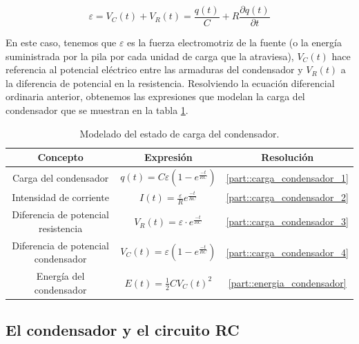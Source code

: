 \documentclass[../main.tex]{subfiles}
\begin{document}
\begin{equation}
    \varepsilon = V_C(t) + V_R(t) = \frac{q(t)}{C} + R\frac{\partial q(t)}{\partial t}
    \label{eqq::balance_energetico_rc_1}
\end{equation}

En este caso, tenemos que $\varepsilon$ es la fuerza electromotriz de la fuente (o la energía suministrada por la pila por cada unidad de carga que la atraviesa), $V_C(t)$ hace referencia al potencial eléctrico entre las armaduras del condensador y $V_R(t)$ a la diferencia de potencial en la resistencia. Resolviendo la ecuación diferencial ordinaria anterior, obtenemos las expresiones que modelan la carga del condensador que se muestran en la tabla \ref{tab::ecuaciones_carga_rc}.


\begin{table}[!ht]
    \begin{center}
        \begin{tabular}{|| c | c | c ||}
            \hline
            \textbf{Concepto} & \textbf{Expresión} &  \textbf{Resolución}\\ \hline
            Carga del condensador & $q(t) = C\varepsilon \left( 1 - e^{\frac{-t}{RC}} \right)$ & \ref{part::carga_condensador_1} \\
            Intensidad de corriente & $I(t) = \frac{\varepsilon}{R}e^{\frac{-t}{RC}}$ & \ref{part::carga_condensador_2} \\
            Diferencia de potencial resistencia & $V_R(t) = \varepsilon \cdot e^{\frac{-t}{RC}}$ & \ref{part::carga_condensador_3} \\ 
            Diferencia de potencial condensador & $V_C(t) = \varepsilon \left(1- e^{\frac{-t}{RC}}\right)$ & \ref{part::carga_condensador_4} \\ 
            Energía del condensador & $E(t) = \frac{1}{2}CV_C(t)^2 $ & \ref{part::energia_condensador}
            \\
            \hline
            \end{tabular}
            \caption{Modelado del estado de carga del condensador.}
            \label{tab::ecuaciones_carga_rc}
    \end{center}
\end{table}





\subsection{El condensador y el circuito RC}
\end{document}
